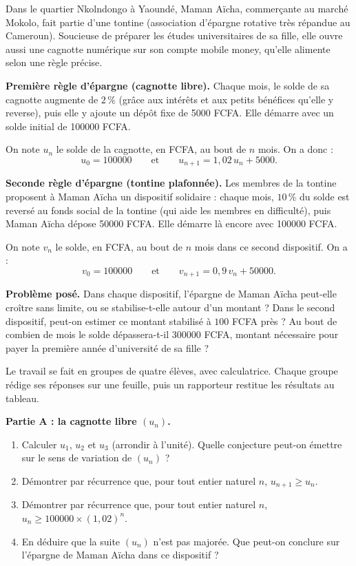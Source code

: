 \documentclass[11pt]{article}
\newcommand{\cle}[1]{{\popxbold\color{popdark}#1}}
\newcounter{popsec}
\newcounter{popsub}
\newcommand{\courssub}[1]{%
  \stepcounter{popsub}%
  \par\vspace{9pt}\noindent{\popxbold\fontsize{11.5}{13}\selectfont\color{popink}{\color{poporange}\thepopsec.\thepopsub}\hspace{6pt}#1}\par\nopagebreak\vspace{4pt}
}
\begin{document}
\courssub{Situation}

Dans le quartier Nkolndongo à Yaoundé, Maman Aïcha, commerçante au marché Mokolo, fait partie d'une \cle{tontine} (association d'épargne rotative très répandue au Cameroun). Soucieuse de préparer les études universitaires de sa fille, elle ouvre aussi une \og cagnotte numérique \fg{} sur son compte mobile money, qu'elle alimente selon une règle précise.

\textbf{Première règle d'épargne (cagnotte libre).} Chaque mois, le solde de sa cagnotte augmente de $2\,\%$ (grâce aux intérêts et aux petits bénéfices qu'elle y reverse), puis elle y ajoute un dépôt fixe de \num{5000} FCFA. Elle démarre avec un solde initial de \num{100000} FCFA.

On note $u_n$ le solde de la cagnotte, en FCFA, au bout de $n$ mois. On a donc :
\[ u_0 = \num{100000} \qquad \text{et} \qquad u_{n+1} = 1{,}02\,u_n + \num{5000}. \]

\textbf{Seconde règle d'épargne (tontine plafonnée).} Les membres de la tontine proposent à Maman Aïcha un dispositif solidaire : chaque mois, $10\,\%$ du solde est reversé au fonds social de la tontine (qui aide les membres en difficulté), puis Maman Aïcha dépose \num{50000} FCFA. Elle démarre là encore avec \num{100000} FCFA.

On note $v_n$ le solde, en FCFA, au bout de $n$ mois dans ce second dispositif. On a :
\[ v_0 = \num{100000} \qquad \text{et} \qquad v_{n+1} = 0{,}9\,v_n + \num{50000}. \]

\textbf{Problème posé.} Dans chaque dispositif, l'épargne de Maman Aïcha peut-elle croître sans limite, ou se stabilise-t-elle autour d'un montant ? Dans le second dispositif, peut-on estimer ce montant stabilisé à $100$ FCFA près ? Au bout de combien de mois le solde dépassera-t-il \num{300000} FCFA, montant nécessaire pour payer la première année d'université de sa fille ?

\courssub{Consignes}

Le travail se fait en groupes de quatre élèves, avec calculatrice. Chaque groupe rédige ses réponses sur une feuille, puis un rapporteur restitue les résultats au tableau.

\textbf{Partie A : la cagnotte libre $(u_n)$.}

\begin{enumerate}
\item Calculer $u_1$, $u_2$ et $u_3$ (arrondir à l'unité). Quelle conjecture peut-on émettre sur le sens de variation de $(u_n)$ ?
\item Démontrer par récurrence que, pour tout entier naturel $n$, $u_{n+1} \geq u_n$.
\item Démontrer par récurrence que, pour tout entier naturel $n$, $u_n \geq \num{100000}\times (1{,}02)^n$.
\item En déduire que la suite $(u_n)$ n'est pas majorée. Que peut-on conclure sur l'épargne de Maman Aïcha dans ce dispositif ?
\end{enumerate}
\end{document}
